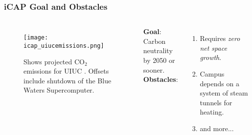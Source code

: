 \begin{frame}
  \frametitle{iCAP Goal and Obstacles}
  \begin{columns}
    \column[t]{5cm}
    \begin{figure}
      \centering
      \texttt{[image: icap\_uiucemissions.png]}
      \caption{Shows projected CO$_2$ emissions for UIUC \cite{isee_illinois_2015}. Offsets include shutdown of the Blue Waters Supercomputer.}
      \label{fig:co2projections}
    \end{figure}

    \column[t]{5cm}
    \textbf{Goal}:\\
    Carbon neutrality by 2050 or sooner.\\
    \vspace{1cm}
    \textbf{Obstacles}:\\
    \begin{enumerate}
      \item Requires \textit{zero net space growth}.
      \item Campus depends on a system of steam tunnels for heating.
      \item and more...
    \end{enumerate}
  \end{columns}
\end{frame}
